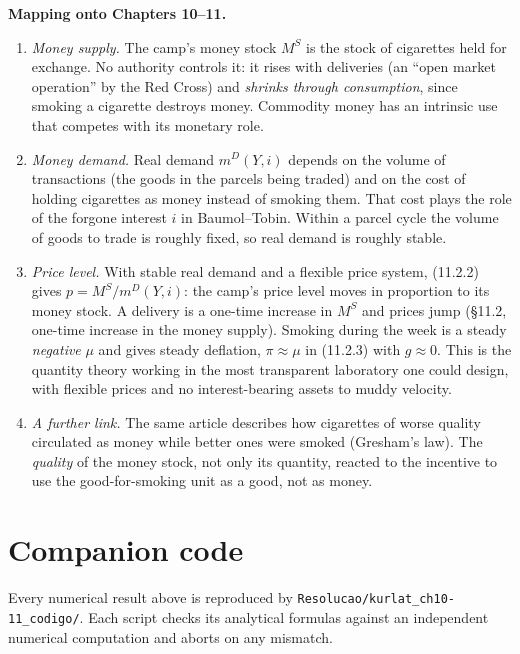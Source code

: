 \documentclass[12pt, letterpaper]{article}
\newcommand{\mD}{m^{D}}
\newcommand{\Ms}{M^{S}}
\begin{document}
\begin{tcolorbox}[oddbox,title={Problem 11.9 \quad Money among Prisoners of War}]
\textbf{Mapping onto Chapters 10--11.}
\begin{enumerate}
\item \emph{Money supply.} The camp's money stock $\Ms$ is the stock of cigarettes held for
exchange. No authority controls it: it rises with deliveries (an ``open market operation''
by the Red Cross) and \emph{shrinks through consumption}, since smoking a cigarette destroys
money. Commodity money has an intrinsic use that competes with its monetary role.
\item \emph{Money demand.} Real demand $\mD(Y,i)$ depends on the volume of transactions (the
goods in the parcels being traded) and on the cost of holding cigarettes as money instead of
smoking them. That cost plays the role of the forgone interest $i$ in Baumol--Tobin. Within a
parcel cycle the volume of goods to trade is roughly fixed, so real demand is roughly stable.
\item \emph{Price level.} With stable real demand and a flexible price system, (11.2.2) gives
$p=\Ms/\mD(Y,i)$: the camp's price level moves in proportion to its money stock. A delivery is a
one-time increase in $\Ms$ and prices jump (\S11.2, one-time increase in the money supply).
Smoking during the week is a steady \emph{negative} $\mu$ and gives steady deflation,
$\pi\approx\mu$ in (11.2.3) with $g\approx0$. This is the quantity theory working in the most
transparent laboratory one could design, with flexible prices and no interest-bearing assets
to muddy velocity.
\item \emph{A further link.} The same article describes how cigarettes of worse quality
circulated as money while better ones were smoked (Gresham's law). The \emph{quality} of the
money stock, not only its quantity, reacted to the incentive to use the good-for-smoking unit
as a good, not as money.
\end{enumerate}
\end{tcolorbox}

\section*{Companion code}

Every numerical result above is reproduced by \texttt{Resolucao/kurlat\_ch10-11\_codigo/}. Each
script checks its analytical formulas against an independent numerical computation and aborts on
any mismatch.
\end{document}
